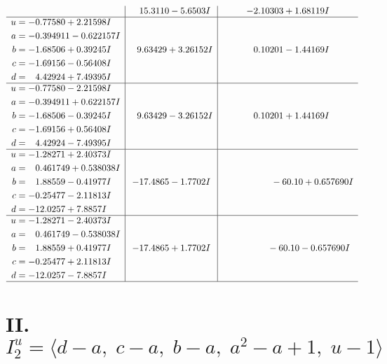 \documentclass[1p]{elsarticle_modified}
\theoremstyle{definition}
\begin{document}
$$\begin{array}{c|c|c}
 & \phantom{-}15.3110 - 5.6503 I & -2.10303 + 1.68119 I \\ \hline\begin{aligned}
u &= -0.77580 + 2.21598 I \\
a &= -0.394911 - 0.622157 I \\
b &= -1.68506 + 0.39245 I \\
c &= -1.69156 - 0.56408 I \\
d &= \phantom{-}4.42924 + 7.49395 I\end{aligned}
 & \phantom{-}9.63429 + 3.26152 I & \phantom{-}0.10201 - 1.44169 I \\ \hline\begin{aligned}
u &= -0.77580 - 2.21598 I \\
a &= -0.394911 + 0.622157 I \\
b &= -1.68506 - 0.39245 I \\
c &= -1.69156 + 0.56408 I \\
d &= \phantom{-}4.42924 - 7.49395 I\end{aligned}
 & \phantom{-}9.63429 - 3.26152 I & \phantom{-}0.10201 + 1.44169 I \\ \hline\begin{aligned}
u &= -1.28271 + 2.40373 I \\
a &= \phantom{-}0.461749 + 0.538038 I \\
b &= \phantom{-}1.88559 - 0.41977 I \\
c &= -0.25477 - 2.11813 I \\
d &= -12.0257 + 7.8857 I\end{aligned}
 & -17.4865 - 1.7702 I & \phantom{-0.000000 -}     -6
0. 10   + 0.657690 I \\ \hline\begin{aligned}
u &= -1.28271 - 2.40373 I \\
a &= \phantom{-}0.461749 - 0.538038 I \\
b &= \phantom{-}1.88559 + 0.41977 I \\
c &= -0.25477 + 2.11813 I \\
d &= -12.0257 - 7.8857 I\end{aligned}
 & -17.4865 + 1.7702 I & \phantom{-0.000000 }      -6
0. 10   - 0.657690 I\\
 \hline 
 \end{array}$$\newpage\newpage\renewcommand{\arraystretch}{1}
\centering \section*{II. $I^u_{2}= \langle d- a,\;c- a,\;b- a,\;a^2- a+1,\;u-1 \rangle$}
\end{document}
